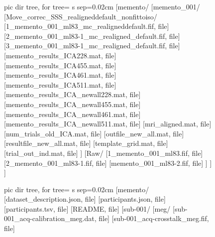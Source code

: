 \begin{figure}[H]
	{\tiny
		\begin{minipage}{.49\textwidth}
			\begin{forest}
				pic dir tree,
				for tree={%
					s sep=0.02cm}
				[memento/
				[memento\_001/
				[Move\_correc\_SSS\_realigneddefault\_nonfittoiso/
				[1\_memento\_001\_ml83\_mc\_realigneddefault.fif, file]
				[2\_memento\_001\_ml83-1\_mc\_realigned\_default.fif, file]
				[3\_memento\_001\_ml83-1\_mc\_realigned\_default.fif, file]
				[memento\_results\_ICA228.mat, file]
				[memento\_results\_ICA455.mat, file]
				[memento\_results\_ICA461.mat, file]
				[memento\_results\_ICA511.mat, file]
				[memento\_results\_ICA\_newall228.mat, file]
				[memento\_results\_ICA\_newall455.mat, file]
				[memento\_results\_ICA\_newall461.mat, file]
				[memento\_results\_ICA\_newall511.mat, file]
				[mri\_aligned.mat, file]
				[num\_trials\_old\_ICA.mat, file]
				[outfile\_new\_all.mat, file]
				[resultfile\_new\_all.mat, file]
				[template\_grid.mat, file]
				[trial\_out\_ind.mat, file]
				]
				[Raw/
				[1\_memento\_001\_ml83.fif, file]
				[2\_memento\_001\_ml83-1.fif, file]
				[memento\_001\_ml83-2.fif, file]
				]
				]
				]
			\end{forest}
		\end{minipage}
		\quad
		\begin{minipage}{.49\textwidth}
			\begin{forest}
				pic dir tree,
				for tree={%
					s sep=0.02cm}
				[memento/
				[dataset\_description.json, file]
				[participants.json, file]
				[participants.tsv, file]
				[README, file]
				[sub-001/
				[meg/
				[sub-001\_acq-calibration\_meg.dat, file]
				[sub-001\_acq-crosstalk\_meg.fif, file]

\end{forest}
\end{minipage}}
\end{figure}
